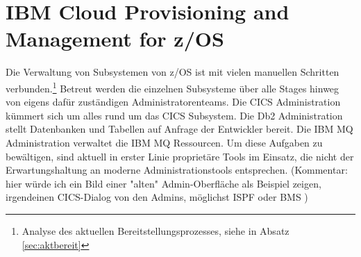 \section{\glqq IBM Cloud Provisioning and Management for z/OS\grqq}
Die Verwaltung von Subsystemen von z/OS ist mit vielen manuellen Schritten verbunden.\footnote{Analyse des aktuellen Bereitstellungsprozesses, siehe in Absatz \ref{sec:aktbereit}}
Betreut werden die einzelnen Subsysteme über alle Stages hinweg von eigens dafür zuständigen Administratorenteams.
Die \glqq CICS Administration\grqq{} kümmert sich um alles rund um das CICS Subsystem.
Die \glqq Db2 Administration\grqq{} stellt Datenbanken und Tabellen auf Anfrage der Entwickler bereit.
Die \glqq IBM MQ Administration\grqq{} verwaltet die IBM MQ Ressourcen.
Um diese Aufgaben zu bewältigen, sind aktuell in erster Linie proprietäre Tools im Einsatz, die nicht der Erwartungshaltung an moderne Administrationstools entsprechen. (Kommentar: hier würde ich ein Bild einer "alten" Admin-Oberfläche als Beispiel zeigen, irgendeinen CICS-Dialog von den Admins, möglichst ISPF oder BMS )

